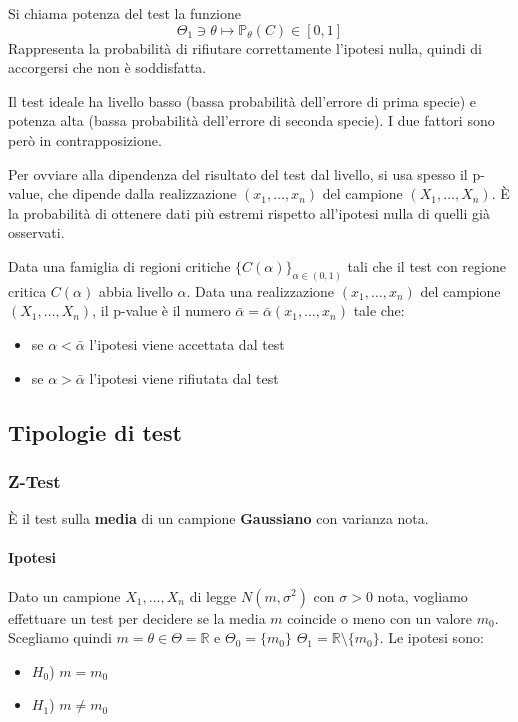 \begin{definition}
	Si chiama potenza del test la funzione
	\begin{equation}
		\Theta_1 \ni \theta \mapsto \mathbb{P}_\theta(C) \in [0,1]
	\end{equation}
	Rappresenta la probabilità di rifiutare correttamente l'ipotesi nulla, quindi di accorgersi che non è soddisfatta.
\end{definition}

\begin{observation}
	Il test ideale ha livello basso (bassa probabilità dell'errore di prima specie) e potenza alta (bassa probabilità dell'errore di seconda specie). I due fattori sono però in contrapposizione.
\end{observation}

Per ovviare alla dipendenza del risultato del test dal livello, si usa spesso il p-value, che dipende dalla realizzazione $(x_1, \ldots, x_n)$ del campione $(X_1, \ldots, X_n)$. È la probabilità di ottenere dati più estremi rispetto all'ipotesi nulla di quelli già osservati.

\begin{definition}[p-value]
	Data una famiglia di regioni critiche $\{C(\alpha)\}_{\alpha \in (0,1)}$ tali che il test con regione critica $C(\alpha)$ abbia livello $\alpha$. Data una realizzazione $(x_1, \ldots, x_n)$ del campione $(X_1, \ldots, X_n)$, il p-value è il numero $\bar{\alpha}=\bar{\alpha}(x_1, \ldots, x_n)$ tale che:
	\begin{itemize}
		\item se $\alpha < \bar{\alpha}$ l'ipotesi viene accettata dal test 
		\item se $\alpha > \bar{\alpha}$ l'ipotesi viene rifiutata dal test
	\end{itemize}
\end{definition}

\subsection{Tipologie di test}
\subsubsection{Z-Test}
È il test sulla \textbf{media} di un campione \textbf{Gaussiano} con varianza nota.

\paragraph{Ipotesi}
Dato un campione $X_1, \ldots, X_n$ di legge $N(m, \sigma^2)$ con $\sigma > 0$ nota, vogliamo effettuare un test per decidere se la media $m$ coincide o meno con un valore $m_0$. Scegliamo quindi $m = \theta \in \Theta = \mathbb{R}$ e $\Theta_0 = \{m_0\}$ $\Theta_1 = \mathbb{R} \setminus \{m_0\}$. Le ipotesi sono:
\begin{itemize}
	\item  \textbf{$H_0$}) $m=m_0$
	\item \textbf{$H_1$}) $m \neq m_0$
\end{itemize}
